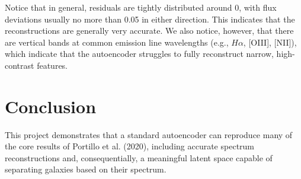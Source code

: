 \documentclass[11pt]{article}
\begin{document}
Notice that in general, residuals are tightly distributed around 0, with flux deviations usually no more than 0.05 in either direction. This indicates that the reconstructions are generally very accurate. We also notice, however, that there are vertical bands at common emission line wavelengths (e.g., $H\alpha$, [OIII], [NII]), which indicate that the autoencoder struggles to fully reconstruct narrow, high-contrast features. 

\section{Conclusion}
This project demonstrates that a standard autoencoder can reproduce many of the core results of Portillo et al. (2020), including accurate spectrum reconstructions and, consequentially, a meaningful latent space capable of separating galaxies based on their spectrum. 



\end{document}
